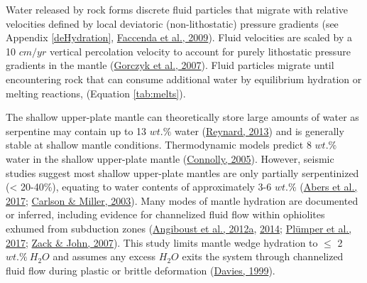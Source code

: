 Water released by rock forms discrete fluid particles that migrate with relative velocities defined by local deviatoric (non-lithostatic) pressure gradients (see Appendix \ref{deHydration}, \protect\hyperlink{ref-faccenda2009}{Faccenda et al., 2009}). Fluid velocities are scaled by a 10 \(cm/yr\) vertical percolation velocity to account for purely lithostatic pressure gradients in the mantle (\protect\hyperlink{ref-gorczyk2007}{Gorczyk et al., 2007}). Fluid particles migrate until encountering rock that can consume additional water by equilibrium hydration or melting reactions, (Equation \ref{tab:melts}).

The shallow upper-plate mantle can theoretically store large amounts of water as serpentine may contain up to 13 \(wt.\%\) water (\protect\hyperlink{ref-reynard2013}{Reynard, 2013}) and is generally stable at shallow mantle conditions. Thermodynamic models predict 8 \(wt.\%\) water in the shallow upper-plate mantle (\protect\hyperlink{ref-connolly2005}{Connolly, 2005}). However, seismic studies suggest most shallow upper-plate mantles are only partially serpentinized (\textless{} 20-40\%), equating to water contents of approximately 3-6 \(wt.\%\) (\protect\hyperlink{ref-abers2017}{Abers et al., 2017}; \protect\hyperlink{ref-carlson2003}{Carlson \& Miller, 2003}). Many modes of mantle hydration are documented or inferred, including evidence for channelized fluid flow within ophiolites exhumed from subduction zones (\protect\hyperlink{ref-angiboust2012a}{Angiboust et al., 2012a}, \protect\hyperlink{ref-angiboust2014}{2014}; \protect\hyperlink{ref-plumper2017}{Plümper et al., 2017}; \protect\hyperlink{ref-zack2007}{Zack \& John, 2007}). This study limits mantle wedge hydration to \(\leq\) 2 \(wt.\%~H_{2}O\) and assumes any excess \(H_{2}O\) exits the system through channelized fluid flow during plastic or brittle deformation (\protect\hyperlink{ref-davies1999}{Davies, 1999}).

